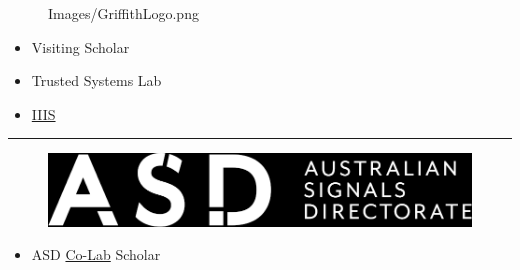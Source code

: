 \documentclass
  [hyperref={colorlinks = true,linkcolor = blue, 
             citecolor = blue, urlcolor = blue}
  ]{beamer}
\begin{document}
\begin{frame}[fragile]
\begin{minipage}{0.5\linewidth}
\begin{figure}[h]
        {Images/GriffithLogo.png}
    \end{figure}
  \end{minipage}
  \hfill
  \begin{minipage}{0.45\linewidth}
  \begin{itemize}
    \item Visiting Scholar
    \item Trusted Systems Lab
    \item \href{https://www.griffith.edu.au/institute-integrated-intelligent-systems}{IIIS}
  \end{itemize}
  \end{minipage}
\hrule
  \begin{minipage}{0.5\linewidth}
    \begin{figure}[h]
      \includegraphics[width=\linewidth]
        {Images/asd-logo.png}
    \end{figure}
  \end{minipage}
  \hfill
  \begin{minipage}{0.45\linewidth}
  \begin{itemize}
    \item ASD 
      \href{https://www.asd.gov.au/about/asd-anu-co-lab}{Co-Lab} 
      Scholar
  \end{itemize}
  \end{minipage}
\end{frame}
\end{document}
